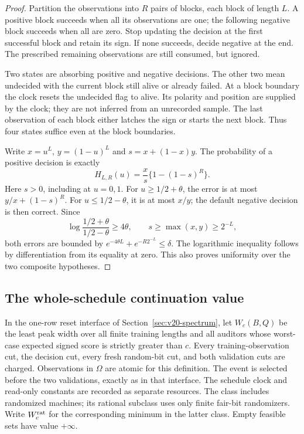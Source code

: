 \begin{proof}
Partition the observations into $R$ pairs of blocks, each block of length
$L$. A positive block succeeds when all its observations are one; the
following negative block succeeds when all are zero. Stop updating the
decision at the first successful block and retain its sign. If none
succeeds, decide negative at the end. The prescribed remaining
observations are still consumed, but ignored.

Two states are absorbing positive and negative decisions. The other two
mean undecided with the current block still alive or already failed.
At a block boundary the clock resets the undecided flag to alive. Its
polarity and position are supplied by the clock; they are not inferred
from an unrecorded sample. The last observation of each block either
latches the sign or starts the next block. Thus four states suffice even
at the block boundaries.

Write $x=u^L$, $y=(1-u)^L$ and $s=x+(1-x)y$. The probability of a
positive decision is exactly
\begin{equation}\label{eq:v21-hazard}
 H_{L,R}(u)=\frac{x}{s}\{1-(1-s)^R\}.
\end{equation}
Here $s>0$, including at $u=0,1$. For $u\ge1/2+\theta$, the error is
at most $y/x+(1-s)^R$. For $u\le1/2-\theta$, it is at most $x/y$;
the default negative decision is then correct. Since
\[
 \log\frac{1/2+\theta}{1/2-\theta}\ge4\theta,
 \qquad s\ge\max(x,y)\ge2^{-L},
\]
both errors are bounded by
$e^{-4\theta L}+e^{-R2^{-L}}\le\delta$.
The logarithmic inequality follows by differentiation from its equality
at zero. This also proves uniformity over the two composite hypotheses.
\end{proof}

\subsection{The whole-schedule continuation value}
In the one-row reset interface of Section~\ref{sec:v20-spectrum}, let
$W_c(B,Q)$ be the least peak width over all finite training lengths and
all auditors whose worst-case expected signed score is strictly greater
than $c$. Every training-observation cut, the decision cut, every fresh
random-bit cut, and both validation cuts are charged. Observations in
$\Omega$ are atomic for this definition. The event is selected before
the two validations, exactly as in that interface. The schedule clock
and read-only constants are recorded as separate resources. The class
includes randomized machines; its rational subclass uses only finite
fair-bit randomizers. Write $W_c^{\rm rat}$ for the corresponding
minimum in the latter class. Empty feasible sets have value $+\infty$.

